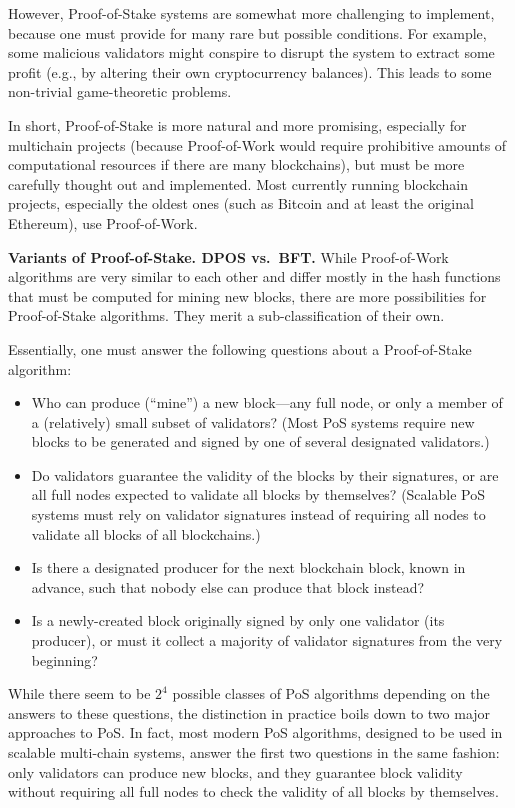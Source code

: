 \documentclass[12pt,oneside]{article}
\def\makepoint#1{\medbreak\noindent{\bf #1.\ }}
\def\nxsubpoint{\refstepcounter{subsubsection}%
  \smallbreak\makepoint{\thesubsubsection}}
\def\embt(#1.){\textbf{#1.}}
\begin{document}
However, Proof-of-Stake systems are somewhat more challenging to
implement, because one must provide for many rare but possible
conditions. For example, some malicious validators might conspire to
disrupt the system to extract some profit (e.g., by altering
their own cryptocurrency balances). This leads to some non-trivial
game-theoretic problems.

In short, Proof-of-Stake is more natural and more promising,
especially for multichain projects (because Proof-of-Work would
require prohibitive amounts of computational resources if there are
many blockchains), but must be more carefully thought out and
implemented. Most currently running blockchain projects, especially
the oldest ones (such as Bitcoin and at least the original Ethereum),
use Proof-of-Work.

\nxsubpoint\label{sp:dpos.bft} \embt(Variants of Proof-of-Stake. DPOS
vs.\ BFT.)  While Proof-of-Work algorithms are very similar to each
other and differ mostly in the hash functions that must be computed
for mining new blocks, there are more possibilities for Proof-of-Stake
algorithms. They merit a sub-classification of their own.

Essentially, one must answer the following questions about a
Proof-of-Stake algorithm:
\begin{itemize}
\item Who can produce (``mine'') a new block---any full node, or only
  a member of a (relatively) small subset of validators?  (Most PoS
  systems require new blocks to be generated and signed by one of
  several designated validators.)
\item Do validators guarantee the validity of the blocks by their
  signatures, or are all full nodes expected to validate all blocks by
  themselves? (Scalable PoS systems must rely on validator signatures
  instead of requiring all nodes to validate all blocks of all
  blockchains.)
\item Is there a designated producer for the next blockchain block,
  known in advance, such that nobody else can produce that block
  instead?
\item Is a newly-created block originally signed by only one validator
  (its producer), or must it collect a majority of validator
  signatures from the very beginning?
\end{itemize}

While there seem to be $2^4$ possible classes of PoS algorithms
depending on the answers to these questions, the distinction in
practice boils down to two major approaches to PoS. In fact, most
modern PoS algorithms, designed to be used in scalable multi-chain
systems, answer the first two questions in the same fashion: only
validators can produce new blocks, and they guarantee block validity
without requiring all full nodes to check the validity of all blocks
by themselves.
\end{document}
